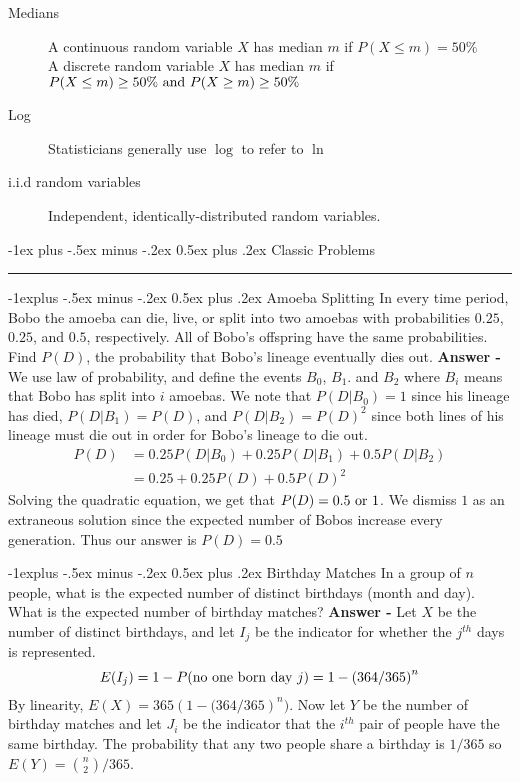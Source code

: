 \documentclass[10pt,landscape]{article}
\makeatletter
\theoremstyle{definition}
\renewcommand{\section}{\@startsection{section}{1}{0mm}%
                                {-1ex plus -.5ex minus -.2ex}%
                                {0.5ex plus .2ex}%
                                {\normalfont\large\bfseries}}
\renewcommand{\subsection}{\@startsection{subsection}{2}{0mm}%
                                {-1explus -.5ex minus -.2ex}%
                                {0.5ex plus .2ex}%
                                {\normalfont\normalsize\bfseries}}
\makeatother
\begin{document}
\begin{multicols}{3}
\begin{description}
\item[Medians] A continuous random variable $X$ has median $m$ if
$P(X \leq m) = 50\%$ \\
A discrete random variable $X$ has median $m$ if
$P(X \leq m) \geq 50\% \textnormal{ and } P(X \geq m) \geq 50\%$
\item[Log] Statisticians generally use $\log$ to refer to $\ln$
\item[i.i.d random variables] Independent, identically-distributed random variables.

\end{description}


\section{Classic Problems} \smallskip \hrule height 2pt \smallskip

\subsection{Amoeba Splitting} In every time period, Bobo the amoeba can die, live, or split into two amoebas with probabilities $0.25$, $0.25$, and $0.5$, respectively. All of Bobo's offspring have the same probabilities. Find $P(D)$, the probability that Bobo's lineage eventually dies out. \textbf{Answer - } We use law of probability, and define the events $B_0$, $B_1$. and $B_2$ where $B_i$ means that Bobo has split into $i$ amoebas. We note that $P(D | B_0) = 1$ since his lineage has died, $P(D | B_1) = P(D)$, and $P(D | B_2) = P(D)^2$ since  both lines of his lineage must die out in order for Bobo's lineage to die out.
\begin{align*}
P(D) &= 0.25P(D|B_0) + 0.25 P(D|B_1) + 0.5 P(D|B_2)\\
&= 0.25 + 0.25P(D) + 0.5P(D)^2
\end{align*}
Solving the quadratic equation, we get that $P(D) = 0.5 \textnormal{ or } 1$. We dismiss $1$ as an extraneous solution since the expected number of Bobos increase every generation. Thus our answer is $\boxed{P(D) = 0.5}$

\subsection{Birthday Matches} In a group of $n$ people, what is the expected number of distinct birthdays (month and day). What is the expected number of birthday matches? \textbf{Answer -} Let $X$ be the number of distinct birthdays, and let $I_j$ be the indicator for whether the $j^{th}$ days is represented. \[E(I_j) = 1-P(\textnormal{no one born day }j) = 1 - \left(364/365\right)^n\] By linearity, $\boxed{E(X) = 365\left(1-(364/365\right)^n)}$. 
Now let $Y$ be the number of birthday matches and let $J_i$ be the indicator that the $i^{th}$ pair of people have the same birthday. The probability that any two people share a birthday is $1/365$ so $\boxed{E(Y) = \binom{n}{2} / 365}$. 


\end{multicols}
\end{document}
